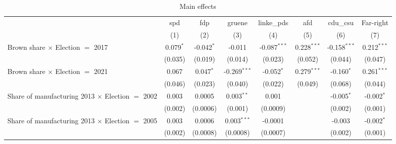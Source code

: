 \begin{table}[htbp]
   \caption{Main effects}
   \centering
   \begin{tabular}{lccccccc}
      \tabularnewline \midrule \midrule
                                                              & spd                  & fdp                   & gruene                & linke\_pds     & afd            & cdu\_csu       & Far-right\\  
                                                              & (1)                  & (2)                   & (3)                   & (4)            & (5)            & (6)            & (7)\\  
      Brown share $\times$ Election $=$ 2017                  & 0.079$^{*}$          & -0.042$^{*}$          & -0.011                & -0.087$^{***}$ & 0.228$^{***}$  & -0.158$^{***}$ & 0.212$^{***}$\\   
                                                              & (0.035)              & (0.019)               & (0.014)               & (0.023)        & (0.052)        & (0.044)        & (0.047)\\   
      Brown share $\times$ Election $=$ 2021                  & 0.067                & 0.047$^{*}$           & -0.269$^{***}$        & -0.052$^{*}$   & 0.279$^{***}$  & -0.160$^{*}$   & 0.261$^{***}$\\   
                                                              & (0.046)              & (0.023)               & (0.040)               & (0.022)        & (0.049)        & (0.068)        & (0.044)\\   
      Share of manufacturing 2013 $\times$ Election $=$ 2002  & 0.003                & 0.0005                & 0.003$^{**}$          & 0.001          &                & -0.005$^{*}$   & -0.002$^{*}$\\   
                                                              & (0.002)              & (0.0006)              & (0.001)               & (0.0009)       &                & (0.002)        & (0.001)\\   
      Share of manufacturing 2013 $\times$ Election $=$ 2005  & 0.003                & 0.0006                & 0.003$^{***}$         & -0.0001        &                & -0.003         & -0.002$^{*}$\\   
                                                              & (0.002)              & (0.0008)              & (0.0008)              & (0.0007)       &                & (0.002)        & (0.001)\\   

\end{tabular}
\end{table}
